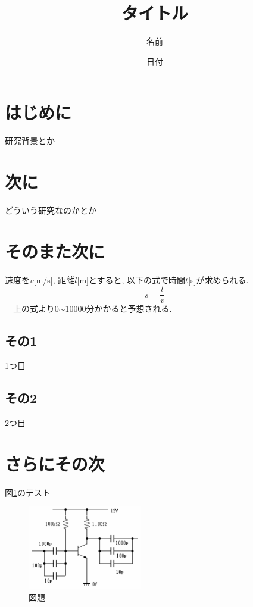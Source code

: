 \documentclass[a4paper,twocolumn,9pt]{jsarticle} %
\title{タイトル}
\author{名前}
\date{日付} %
\begin{document}
\maketitle

\section{はじめに}
研究背景とか

\section{次に}
どういう研究なのかとか

\section{そのまた次に}
速度を$v$[m/s], 距離$l$[m]とすると, 以下の式で時間$t$[s]が求められる. \\
\[
s =\frac{l}{v}
\]
~~上の式より0$\sim$10000分かかると予想される.　\\
\subsection{その1}
1つ目

\subsection{その2}
2つ目

\section{さらにその次}
図\ref{fig1}のテスト

\begin{figure}[htbp]
 \begin{center}
  \includegraphics[clip,width=50mm]{fig.eps} %
   \caption{図題}
   \label{fig1}
 \end{center}
\end{figure}
\end{document}
